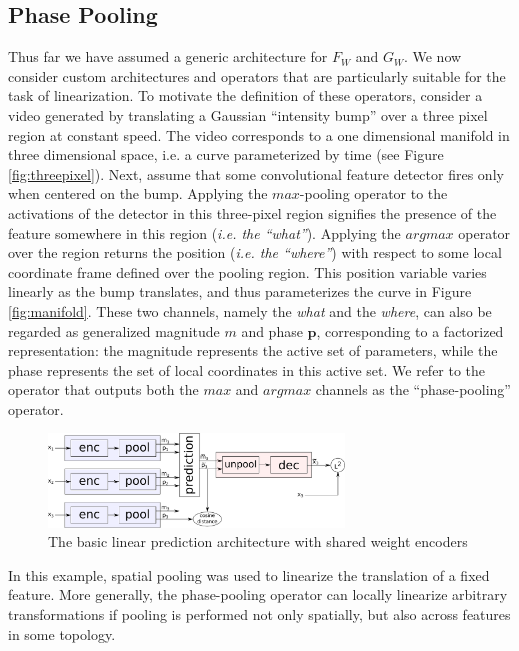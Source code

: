 \subsection{Phase Pooling} 
\label{subsec:phase pooling} 
Thus far we have assumed a generic architecture for $F_W$ and $G_W$. We now consider custom architectures and operators that are particularly suitable for the task of linearization. To motivate the definition of these operators, consider a video generated by translating a Gaussian ``intensity bump'' over a three pixel region at constant speed. The video corresponds to a one dimensional manifold in three dimensional space, i.e. a curve parameterized by time (see Figure \ref{fig:threepixel}). Next, assume that some convolutional feature detector fires only when centered on the bump.
Applying the $max$-pooling operator to the activations of the detector in this three-pixel region signifies the presence of the feature somewhere in this region (\emph{i.e. the ``what''}). Applying the $argmax$ operator over the region returns the position (\emph{i.e. the ``where''}) with respect to some local coordinate frame defined over the pooling region. This position variable varies linearly as the bump translates, and thus parameterizes the curve in Figure \ref{fig:manifold}. These two channels, namely the \emph{what} and the \emph{where}, can also be regarded as generalized magnitude $m$ and phase $\mathbf p$, corresponding to a factorized representation: the magnitude represents the active set of parameters, while the phase represents the set of local coordinates in this active set.
 We refer to the operator that outputs both the $max$ and $argmax$ channels as the ``phase-pooling'' operator.

\begin{figure}
  \centering
   \includegraphics[width=0.7\textwidth]{./figures/linear/network.pdf}
   \caption{The basic linear prediction architecture with shared weight encoders}
   \label{fig:arch1}
\end{figure}

In this example, spatial pooling was used to linearize the translation of a fixed feature. More generally, the phase-pooling operator can locally linearize arbitrary transformations if pooling is performed not only spatially, but also across features in some topology.

